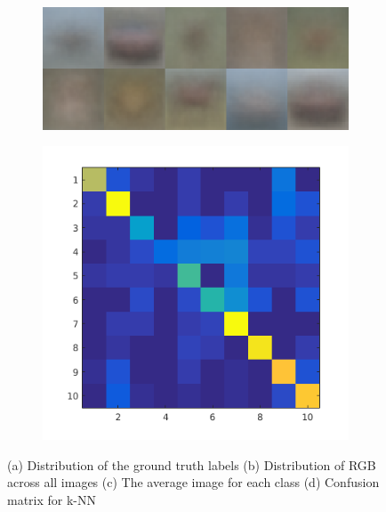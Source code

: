 \documentclass{article} %
\begin{document}
\begin{figure}
\begin{subfigure}{.24\linewidth}
        \caption{}
        \end{subfigure}
        \begin{subfigure}{.24\linewidth}
            \centering
            \includegraphics[width=\linewidth]{images/avg-img.png}
        \caption{}
        \end{subfigure}
        \begin{subfigure}{.24\linewidth}
            \centering
            \includegraphics[width=.75\linewidth]{images/knn-confusion.png}
            \caption{}
        \end{subfigure}
        \caption{(a) Distribution of the ground truth labels (b) Distribution of RGB across all images (c) The average image for each class (d) Confusion matrix for k-NN}
        \label{fig:exploratory}
    \end{figure}
    
\end{document}
